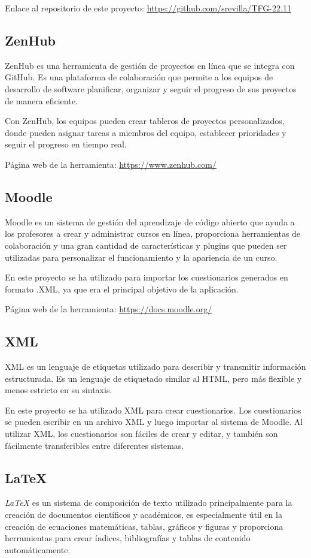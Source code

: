 Enlace al repositorio de este proyecto: \url{https://github.com/srevilla/TFG-22.11}

\subsection{ZenHub}
ZenHub es una herramienta de gestión de proyectos en línea que se integra con GitHub. Es una plataforma de colaboración que permite a los equipos de desarrollo de software planificar, organizar y seguir el progreso de sus proyectos de manera eficiente.\cite{zenhub}

Con ZenHub, los equipos pueden crear tableros de proyectos personalizados, donde pueden asignar tareas a miembros del equipo, establecer prioridades y seguir el progreso en tiempo real.

Página web de la herramienta: \url{https://www.zenhub.com/}

\subsection{Moodle}
 Moodle es un sistema de gestión del aprendizaje de código abierto que ayuda a los profesores a crear y administrar cursos en línea, proporciona herramientas de colaboración y una gran cantidad de características y plugins que pueden ser utilizadas para personalizar el funcionamiento y la apariencia de un curso.\cite{moodle}

 En este proyecto se ha utilizado para importar los cuestionarios generados en formato .XML, ya que era el principal objetivo de la aplicación.

 Página web de la herramienta: \url{https://docs.moodle.org/}

 \subsection{XML}
XML es un lenguaje de etiquetas utilizado para describir y transmitir información estructurada. Es un lenguaje de etiquetado similar al HTML, pero más flexible y menos estricto en su sintaxis.\cite{wiki:xml}

 En este proyecto se ha utilizado XML para crear cuestionarios. Los cuestionarios se pueden escribir en un archivo XML y luego importar al sistema de Moodle. Al utilizar XML, los cuestionarios son fáciles de crear y editar, y también son fácilmente transferibles entre diferentes sistemas.

 \subsection{\LaTeX}
\textit{\LaTeX} es un sistema de composición de texto utilizado principalmente para la creación de documentos científicos y académicos, es especialmente útil en la creación de ecuaciones matemáticas, tablas, gráficos y figuras y proporciona herramientas para crear índices, bibliografías y tablas de contenido automáticamente.\cite{wiki:latex}

